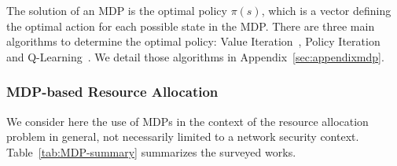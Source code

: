 The solution of an MDP is the optimal policy $\pi(s)$, which is a vector defining the optimal action for each possible state in the MDP.
There are three main algorithms to determine the optimal policy: Value Iteration~\cite{bellman1957}, Policy Iteration~\cite{policyiteration} and Q-Learning~\cite{qlearning}.
We detail those algorithms in Appendix~\ref{sec:appendixmdp}. 


\subsubsection{MDP-based Resource Allocation}
We consider here the use of MDPs in the context of the resource allocation problem in general, not necessarily limited to a network security context.
Table~\ref{tab:MDP-summary} summarizes the surveyed works.


